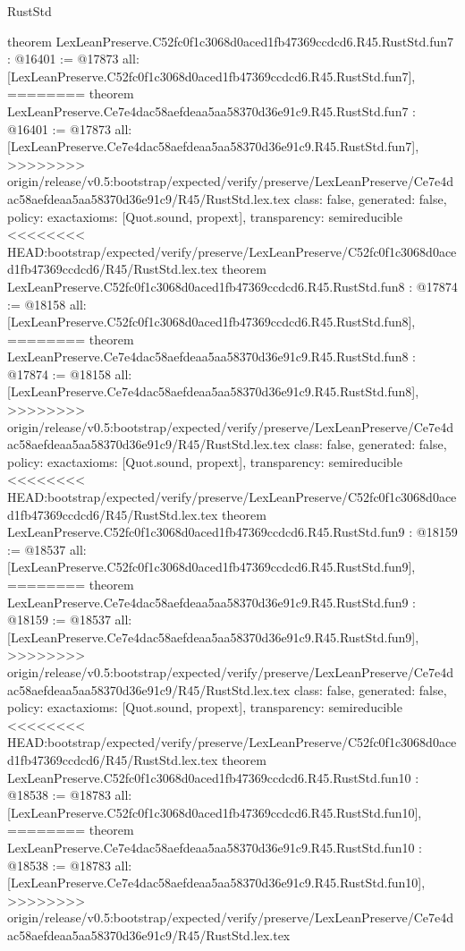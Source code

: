 \begin{lexlean}{RustStd}
\begin{coremodule}
{\begin{coremodule}
{{{{{{{{{theorem LexLeanPreserve.C52fc0f1c3068d0aced1fb47369ccdcd6.R45.RustStd.fun7 : @16401 := @17873 {
  all: [LexLeanPreserve.C52fc0f1c3068d0aced1fb47369ccdcd6.R45.RustStd.fun7],
========
theorem LexLeanPreserve.Ce7e4dac58aefdeaa5aa58370d36e91c9.R45.RustStd.fun7 : @16401 := @17873 {
  all: [LexLeanPreserve.Ce7e4dac58aefdeaa5aa58370d36e91c9.R45.RustStd.fun7],
>>>>>>>> origin/release/v0.5:bootstrap/expected/verify/preserve/LexLeanPreserve/Ce7e4dac58aefdeaa5aa58370d36e91c9/R45/RustStd.lex.tex
  class: false,
  generated: false,
  policy: exact{axioms: [Quot.sound, propext]},
  transparency: semireducible
}
<<<<<<<< HEAD:bootstrap/expected/verify/preserve/LexLeanPreserve/C52fc0f1c3068d0aced1fb47369ccdcd6/R45/RustStd.lex.tex
theorem LexLeanPreserve.C52fc0f1c3068d0aced1fb47369ccdcd6.R45.RustStd.fun8 : @17874 := @18158 {
  all: [LexLeanPreserve.C52fc0f1c3068d0aced1fb47369ccdcd6.R45.RustStd.fun8],
========
theorem LexLeanPreserve.Ce7e4dac58aefdeaa5aa58370d36e91c9.R45.RustStd.fun8 : @17874 := @18158 {
  all: [LexLeanPreserve.Ce7e4dac58aefdeaa5aa58370d36e91c9.R45.RustStd.fun8],
>>>>>>>> origin/release/v0.5:bootstrap/expected/verify/preserve/LexLeanPreserve/Ce7e4dac58aefdeaa5aa58370d36e91c9/R45/RustStd.lex.tex
  class: false,
  generated: false,
  policy: exact{axioms: [Quot.sound, propext]},
  transparency: semireducible
}
<<<<<<<< HEAD:bootstrap/expected/verify/preserve/LexLeanPreserve/C52fc0f1c3068d0aced1fb47369ccdcd6/R45/RustStd.lex.tex
theorem LexLeanPreserve.C52fc0f1c3068d0aced1fb47369ccdcd6.R45.RustStd.fun9 : @18159 := @18537 {
  all: [LexLeanPreserve.C52fc0f1c3068d0aced1fb47369ccdcd6.R45.RustStd.fun9],
========
theorem LexLeanPreserve.Ce7e4dac58aefdeaa5aa58370d36e91c9.R45.RustStd.fun9 : @18159 := @18537 {
  all: [LexLeanPreserve.Ce7e4dac58aefdeaa5aa58370d36e91c9.R45.RustStd.fun9],
>>>>>>>> origin/release/v0.5:bootstrap/expected/verify/preserve/LexLeanPreserve/Ce7e4dac58aefdeaa5aa58370d36e91c9/R45/RustStd.lex.tex
  class: false,
  generated: false,
  policy: exact{axioms: [Quot.sound, propext]},
  transparency: semireducible
}
<<<<<<<< HEAD:bootstrap/expected/verify/preserve/LexLeanPreserve/C52fc0f1c3068d0aced1fb47369ccdcd6/R45/RustStd.lex.tex
theorem LexLeanPreserve.C52fc0f1c3068d0aced1fb47369ccdcd6.R45.RustStd.fun10 : @18538 := @18783 {
  all: [LexLeanPreserve.C52fc0f1c3068d0aced1fb47369ccdcd6.R45.RustStd.fun10],
========
theorem LexLeanPreserve.Ce7e4dac58aefdeaa5aa58370d36e91c9.R45.RustStd.fun10 : @18538 := @18783 {
  all: [LexLeanPreserve.Ce7e4dac58aefdeaa5aa58370d36e91c9.R45.RustStd.fun10],
>>>>>>>> origin/release/v0.5:bootstrap/expected/verify/preserve/LexLeanPreserve/Ce7e4dac58aefdeaa5aa58370d36e91c9/R45/RustStd.lex.tex
}}}}}}}}}}}}}}
\end{coremodule}}
\end{coremodule}
\end{lexlean}
